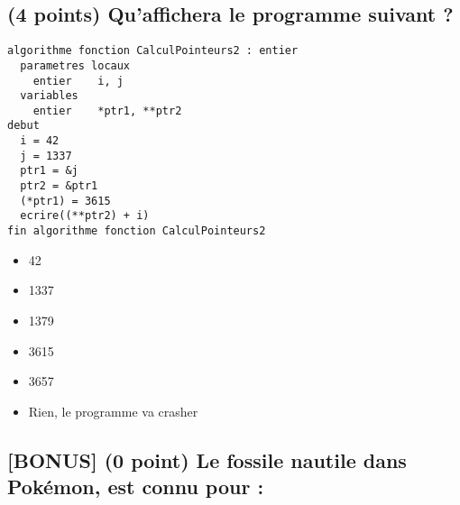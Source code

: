 \documentclass[11pt,a4paper]{article}
\begin{document}
\subsection{(4 points) Qu'affichera le programme suivant ? }

\begin{lstlisting}[style=algorithmique]
algorithme fonction CalculPointeurs2 : entier
  parametres locaux
    entier    i, j
  variables
    entier    *ptr1, **ptr2
debut
  i = 42
  j = 1337
  ptr1 = &j
  ptr2 = &ptr1
  (*ptr1) = 3615
  ecrire((**ptr2) + i)
fin algorithme fonction CalculPointeurs2
\end{lstlisting}

\begin{table}[ht!]
  \centering
  \begin{minipage}{0.45\textwidth}
    \centering
\begin{itemize}
  \item[\CaseCoche] 42 \\  
  \item[\CaseCoche] 1337 \\
  \item[\CaseCoche] 1379 \\
\end{itemize}
  \end{minipage}
  \hfillx
  \begin{minipage}{0.45\textwidth}
    \centering
\begin{itemize}
  \item[\CaseCoche] 3615 \\
  \item[\checkmark] 3657 \\  
  \item[\CaseCoche] Rien, le programme va crasher \\
\end{itemize}
  \end{minipage}
\end{table}


\bigskip

\subsection{[BONUS] (0 point) Le fossile nautile dans Pokémon, est connu pour : }
\end{document}

